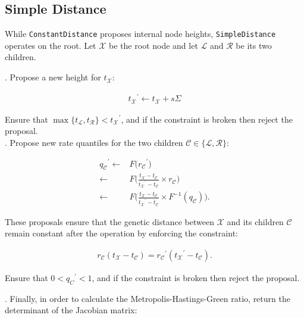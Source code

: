 \documentclass[12pt]{article}
\begin{document}
\subsection*{Simple Distance}

While \texttt{ConstantDistance} proposes internal node heights, \texttt{SimpleDistance} operates on the root. Let $\mathcal{X}$ be the root node and let $\mathcal{L}$ and $\mathcal{R}$ be its two children.

. Propose a new height for $t_\mathcal{X}$:

\begin{align}
	{t_\mathcal{X}}^\prime \leftarrow t_\mathcal{X} + s\Sigma
\end{align}

Ensure that $\max\{t_\mathcal{L}, t_\mathcal{R} \} < {t_\mathcal{X}}^\prime$, and if the constraint is broken then reject the proposal.  \\


. Propose new rate quantiles for the two children $\mathcal{C} \in \{\mathcal{L}, \mathcal{R}\}$:



\begin{align}
	{q_\mathcal{C}}^\prime  \leftarrow & F\Big({r_\mathcal{C}}^\prime \Big)  \nonumber \\
				\leftarrow & F \Big( \frac{t_\mathcal{X} - t_\mathcal{C}}{{t_\mathcal{X}}^\prime - t_\mathcal{C}} \times r_\mathcal{C} \Big) \nonumber \\
				\leftarrow & F \Big( \frac{t_\mathcal{X} - t_\mathcal{C}}{{t_\mathcal{X}}^\prime - t_\mathcal{C}} \times F^{-1}(q_\mathcal{C}) \Big).
\end{align}




These proposals ensure that the genetic distance between $\mathcal{X}$ and its children $\mathcal{C}$ remain constant after the operation by enforcing the constraint:


\begin{align}
	r_\mathcal{C} (t_\mathcal{X} - t_\mathcal{C}) = {r_\mathcal{C}}^\prime ({t_\mathcal{X}}^\prime - t_\mathcal{C}).
\end{align}


Ensure that $0 < {q_C}^\prime < 1$, and if the constraint is broken then reject the proposal. 



. Finally, in order to calculate the Metropolis-Hastings-Green ratio, return the determinant of the Jacobian matrix:
\end{document}
